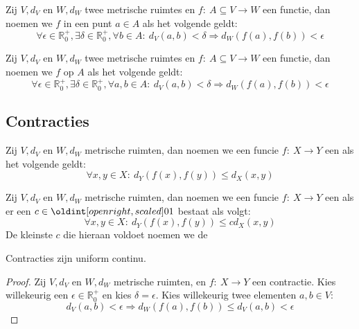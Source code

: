 \documentclass[main.tex]{subfiles}
\begin{document}
\begin{de}
  Zij $V,d_{V}$ en $W,d_{W}$ twee metrische ruimtes en $f:\ A \subseteq V \rightarrow W$ een functie, dan noemen we $f$  in een punt $a\in A$ als het volgende geldt:
  \[ \forall \epsilon \in \mathbb{R}_{0}^{+}, \exists \delta \in \mathbb{R}_{0}^{+}, \forall b \in A:\ d_{V}(a,b)< \delta \Rightarrow d_{W}(f(a),f(b)) < \epsilon \]
\end{de}

\begin{de}
  Zij $V,d_{V}$ en $W,d_{W}$ twee metrische ruimtes en $f:\ A \subseteq V \rightarrow W$ een functie, dan noemen we $f$  op $A$ als het volgende geldt:
  \[ \forall \epsilon \in \mathbb{R}_{0}^{+}, \exists \delta \in \mathbb{R}_{0}^{+}, \forall a,b \in A:\ d_{V}(a,b)< \delta \Rightarrow d_{W}(f(a),f(b)) < \epsilon \]
\end{de}

\subsection{Contracties}
\label{sec:contracties}

\begin{de}
  Zij $V,d_{V}$ en $W,d_{W}$ metrische ruimten, dan noemen we een funcie $f:\ X \rightarrow Y$ een  als het volgende geldt:
  \[ \forall x,y\in X:\ d_{Y}(f(x),f(y)) \le d_{X}(x,y) \]
\end{de}

\begin{de}
  Zij $V,d_{V}$ en $W,d_{W}$ metrische ruimten, dan noemen we een funcie $f:\ X \rightarrow Y$ een  als er een $c\in \interval[open right]{0}{1}$ bestaat als volgt:
  \[ \forall x,y\in X:\ d_{Y}(f(x),f(y)) \le c d_{X}(x,y) \]
  De kleinste $c$ die hieraan voldoet noemen we de 
\end{de}

\begin{st}
  Contracties zijn uniform continu.

  \begin{proof}
    Zij $V,d_{V}$ en $W,d_{W}$ metrische ruimten, en $f:\ X \rightarrow Y$ een contractie.
    Kies willekeurig een $\epsilon\in\mathbb{R}_{0}^{+}$ en kies $\delta = \epsilon$.
    Kies willekeurig twee elementen $a,b\in V$:
    \[ d_{V}(a,b) < \epsilon \Rightarrow d_{W}(f(a),f(b)) \le d_{V}(a,b) < \epsilon \]
  \end{proof}
\end{st}
\end{document}
